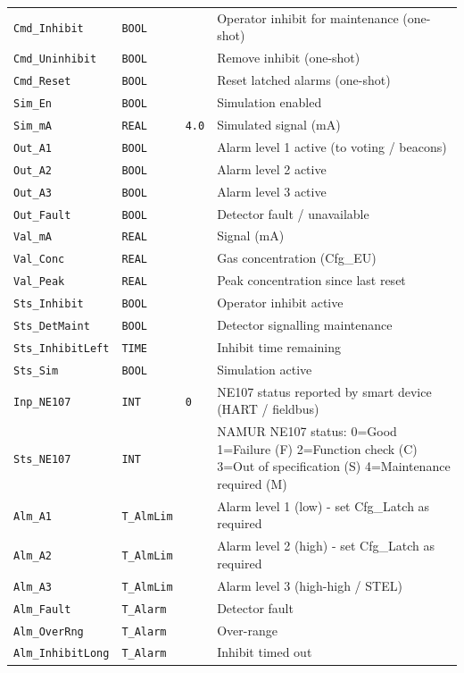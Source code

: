 {\begin{longtable}{@{}>{\raggedright\arraybackslash}p{3.4cm}>{\raggedright\arraybackslash}p{3.3cm}>{\raggedright\arraybackslash}p{1.3cm}>{\raggedright\arraybackslash}p{6.4cm}@{}}
\texttt{Cmd\_Inhibit} & \texttt{BOOL} &  & Operator inhibit for maintenance (one-shot) \\
\texttt{Cmd\_Uninhibit} & \texttt{BOOL} &  & Remove inhibit (one-shot) \\
\texttt{Cmd\_Reset} & \texttt{BOOL} &  & Reset latched alarms (one-shot) \\
\texttt{Sim\_En} & \texttt{BOOL} &  & Simulation enabled \\
\texttt{Sim\_mA} & \texttt{REAL} & \texttt{4.0} & Simulated signal (mA) \\
\texttt{Out\_A1} & \texttt{BOOL} &  & Alarm level 1 active (to voting /\allowbreak{} beacons) \\
\texttt{Out\_A2} & \texttt{BOOL} &  & Alarm level 2 active \\
\texttt{Out\_A3} & \texttt{BOOL} &  & Alarm level 3 active \\
\texttt{Out\_Fault} & \texttt{BOOL} &  & Detector fault /\allowbreak{} unavailable \\
\texttt{Val\_mA} & \texttt{REAL} &  & Signal (mA) \\
\texttt{Val\_Conc} & \texttt{REAL} &  & Gas concentration (Cfg\_EU) \\
\texttt{Val\_Peak} & \texttt{REAL} &  & Peak concentration since last reset \\
\texttt{Sts\_Inhibit} & \texttt{BOOL} &  & Operator inhibit active \\
\texttt{Sts\_DetMaint} & \texttt{BOOL} &  & Detector signalling maintenance \\
\texttt{Sts\_InhibitLeft} & \texttt{TIME} &  & Inhibit time remaining \\
\texttt{Sts\_Sim} & \texttt{BOOL} &  & Simulation active \\
\texttt{Inp\_NE107} & \texttt{INT} & \texttt{0} & NE107 status reported by smart device (HART /\allowbreak{} fieldbus) \\
\texttt{Sts\_NE107} & \texttt{INT} &  & NAMUR NE107 status: 0=Good 1=Failure (F) 2=Function check (C) 3=Out of specification (S) 4=Maintenance required (M) \\
\texttt{Alm\_A1} & \texttt{T\_AlmLim} &  & Alarm level 1 (low) - set Cfg\_Latch as required \\
\texttt{Alm\_A2} & \texttt{T\_AlmLim} &  & Alarm level 2 (high) - set Cfg\_Latch as required \\
\texttt{Alm\_A3} & \texttt{T\_AlmLim} &  & Alarm level 3 (high-high /\allowbreak{} STEL) \\
\texttt{Alm\_Fault} & \texttt{T\_Alarm} &  & Detector fault \\
\texttt{Alm\_OverRng} & \texttt{T\_Alarm} &  & Over-range \\
\texttt{Alm\_InhibitLong} & \texttt{T\_Alarm} &  & Inhibit timed out \\
\bottomrule
\end{longtable}
}
